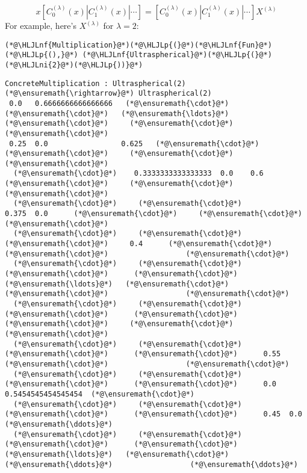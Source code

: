 \documentclass[12pt,landscape]{article}
\newcommand{\HLJLnf}[1]{\textcolor[RGB]{66,102,213}{#1}}
\newcommand{\HLJLni}[1]{\textcolor[RGB]{59,151,46}{#1}}
\newcommand{\HLJLp}[1]{#1}
\begin{document}
{\[
x\left[ C^{(\lambda)}_0(x) | C^{(\lambda)}_1(x) | \cdots  \right] = \left[ C^{(\lambda)}_0(x) | C^{(\lambda)}_1(x) | \cdots  \right]X^{(\lambda)}
\]
For example, here's $X^{(\lambda)}$ for $\lambda = 2$:


\begin{lstlisting}
(*@\HLJLnf{Multiplication}@*)(*@\HLJLp{(}@*)(*@\HLJLnf{Fun}@*)(*@\HLJLp{(),}@*) (*@\HLJLnf{Ultraspherical}@*)(*@\HLJLp{(}@*)(*@\HLJLni{2}@*)(*@\HLJLp{))}@*)
\end{lstlisting}

\begin{lstlisting}
ConcreteMultiplication : Ultraspherical(2) (*@\ensuremath{\rightarrow}@*) Ultraspherical(2)
 0.0   0.6666666666666666   (*@\ensuremath{\cdot}@*)      (*@\ensuremath{\cdot}@*)   (*@\ensuremath{\ldots}@*)   (*@\ensuremath{\cdot}@*)     (*@\ensuremath{\cdot}@*)                  (*@\ensuremath{\cdot}@*)
 0.25  0.0                 0.625   (*@\ensuremath{\cdot}@*)       (*@\ensuremath{\cdot}@*)     (*@\ensuremath{\cdot}@*)                  (*@\ensuremath{\cdot}@*)
  (*@\ensuremath{\cdot}@*)    0.3333333333333333  0.0    0.6      (*@\ensuremath{\cdot}@*)     (*@\ensuremath{\cdot}@*)                  (*@\ensuremath{\cdot}@*)
  (*@\ensuremath{\cdot}@*)     (*@\ensuremath{\cdot}@*)                  0.375  0.0      (*@\ensuremath{\cdot}@*)     (*@\ensuremath{\cdot}@*)                  (*@\ensuremath{\cdot}@*)
  (*@\ensuremath{\cdot}@*)     (*@\ensuremath{\cdot}@*)                   (*@\ensuremath{\cdot}@*)     0.4      (*@\ensuremath{\cdot}@*)     (*@\ensuremath{\cdot}@*)                  (*@\ensuremath{\cdot}@*)
  (*@\ensuremath{\cdot}@*)     (*@\ensuremath{\cdot}@*)                   (*@\ensuremath{\cdot}@*)      (*@\ensuremath{\cdot}@*)   (*@\ensuremath{\ldots}@*)   (*@\ensuremath{\cdot}@*)     (*@\ensuremath{\cdot}@*)                  (*@\ensuremath{\cdot}@*)
  (*@\ensuremath{\cdot}@*)     (*@\ensuremath{\cdot}@*)                   (*@\ensuremath{\cdot}@*)      (*@\ensuremath{\cdot}@*)       (*@\ensuremath{\cdot}@*)     (*@\ensuremath{\cdot}@*)                  (*@\ensuremath{\cdot}@*)
  (*@\ensuremath{\cdot}@*)     (*@\ensuremath{\cdot}@*)                   (*@\ensuremath{\cdot}@*)      (*@\ensuremath{\cdot}@*)      0.55   (*@\ensuremath{\cdot}@*)                  (*@\ensuremath{\cdot}@*)
  (*@\ensuremath{\cdot}@*)     (*@\ensuremath{\cdot}@*)                   (*@\ensuremath{\cdot}@*)      (*@\ensuremath{\cdot}@*)      0.0   0.5454545454545454  (*@\ensuremath{\cdot}@*)
  (*@\ensuremath{\cdot}@*)     (*@\ensuremath{\cdot}@*)                   (*@\ensuremath{\cdot}@*)      (*@\ensuremath{\cdot}@*)      0.45  0.0                 (*@\ensuremath{\ddots}@*)
  (*@\ensuremath{\cdot}@*)     (*@\ensuremath{\cdot}@*)                   (*@\ensuremath{\cdot}@*)      (*@\ensuremath{\cdot}@*)   (*@\ensuremath{\ldots}@*)   (*@\ensuremath{\cdot}@*)     (*@\ensuremath{\ddots}@*)                  (*@\ensuremath{\ddots}@*)
\end{lstlisting}


}
\end{document}
